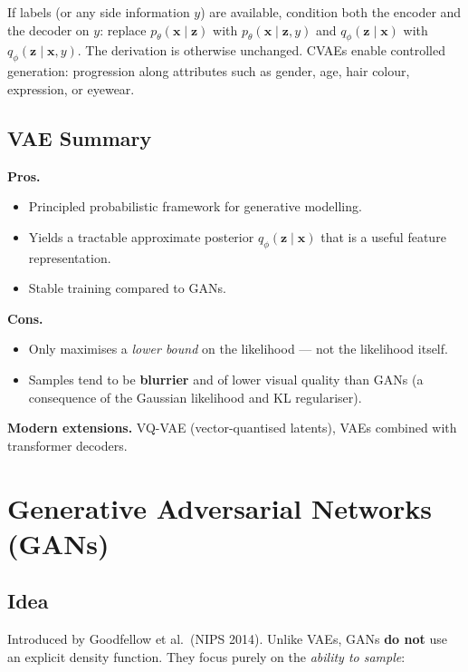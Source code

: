 \documentclass[11pt,a4paper]{article}
\theoremstyle{definition}
\theoremstyle{plain}
\theoremstyle{remark}
\begin{document}
If labels (or any side information $y$) are available, condition both the encoder and the decoder on $y$: replace $p_\theta(\mathbf{x}\mid\mathbf{z})$ with $p_\theta(\mathbf{x}\mid\mathbf{z}, y)$ and $q_\phi(\mathbf{z}\mid\mathbf{x})$ with $q_\phi(\mathbf{z}\mid\mathbf{x}, y)$. The derivation is otherwise unchanged. CVAEs enable controlled generation: progression along attributes such as gender, age, hair colour, expression, or eyewear.

\subsection{VAE Summary}

\begin{tcolorbox}[colback=green!5!white, colframe=green!60!black, title={VAE: pros and cons}]
\textbf{Pros.}
\begin{itemize}
    \item Principled probabilistic framework for generative modelling.
    \item Yields a tractable approximate posterior $q_\phi(\mathbf{z}\mid\mathbf{x})$ that is a useful feature representation.
    \item Stable training compared to GANs.
\end{itemize}
\textbf{Cons.}
\begin{itemize}
    \item Only maximises a \emph{lower bound} on the likelihood --- not the likelihood itself.
    \item Samples tend to be \textbf{blurrier} and of lower visual quality than GANs (a consequence of the Gaussian likelihood and KL regulariser).
\end{itemize}
\textbf{Modern extensions.} VQ-VAE (vector-quantised latents), VAEs combined with transformer decoders.
\end{tcolorbox}


\section{Generative Adversarial Networks (GANs)}

\subsection{Idea}

Introduced by Goodfellow et al.\ (NIPS 2014). Unlike VAEs, GANs \textbf{do not} use an explicit density function. They focus purely on the \emph{ability to sample}:
\end{document}
